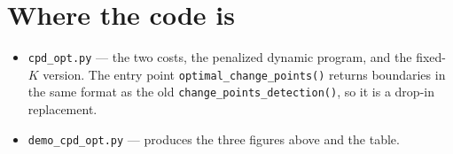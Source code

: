 \documentclass[11pt]{article}
\begin{document}
\section{Where the code is}

\sloppy
\begin{itemize}
\itemsep2pt
\item \texttt{cpd\_opt.py} --- the two costs, the penalized dynamic program, and
the fixed-$K$ version. The entry point
\texttt{optimal\_change\_points()} returns boundaries in the same format as the
old \texttt{change\_points\_detection()}, so it is a drop-in replacement.
\item \texttt{demo\_cpd\_opt.py} --- produces the three figures above and the table.
\end{itemize}
\end{document}
